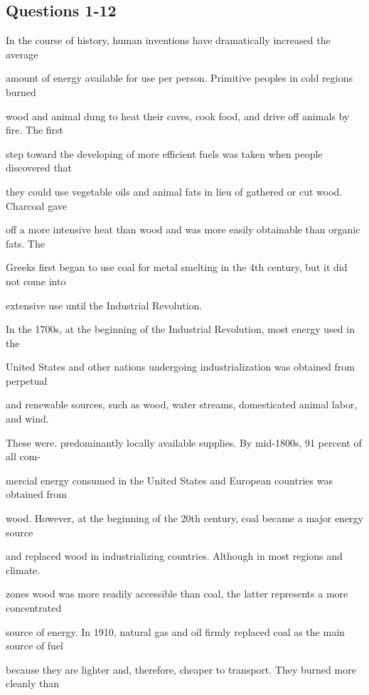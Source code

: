 \documentclass[12pt]{article}
\begin{document}
\subsection*{Questions 1-12}
\begingroup
\small
\sloppy
\setlength{\parskip}{0pt}
\setlength{\parindent}{0pt}
In the course of history, human inventions have dramatically increased the average\par
amount of energy available for use per person. Primitive peoples in cold regions burned\par
wood and animal dung to heat their caves, cook food, and drive off animals by fire. The first\par
step toward the developing of more efficient fuels was taken when people discovered that\par
they could use vegetable oils and animal fats in lieu of gathered or cut wood. Charcoal gave\par
off a more intensive heat than wood and was more easily obtainable than organic fats. The\par
Greeks first began to use coal for metal smelting in the 4th century, but it did not come into\par
extensive use until the Industrial Revolution.\par
In the 1700s, at the beginning of the Industrial Revolution, most energy used in the\par
United States and other nations undergoing industrialization was obtained from perpetual\par
and renewable sources, such as wood, water streams, domesticated animal labor, and wind.\par
These were. predominantly locally available supplies. By mid-1800s, 91 percent of all com-\par
mercial energy consumed in the United States and European countries was obtained from\par
wood. However, at the beginning of the 20th century, coal became a major energy source\par
and replaced wood in industrializing countries. Although in most regions and climate.\par
zones wood was more readily accessible than coal, the latter represents a more concentrated\par
source of energy. In 1910, natural gas and oil firmly replaced coal as the main source of fuel\par
because they are lighter and, therefore, cheaper to transport. They burned more cleanly than\par
\end{document}
